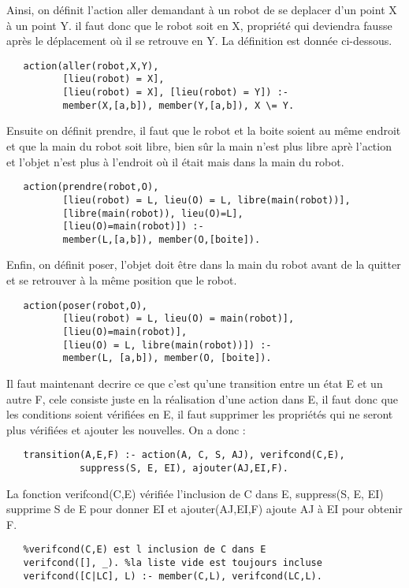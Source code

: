 \documentclass[a4paper,10pt]{article}
\begin{document}
  Ainsi, on d\'{e}finit l'action aller demandant \`{a} un robot de se deplacer d'un point X \`{a} un point Y. il faut donc que le robot soit en X,
  propri\'{e}t\'{e} qui deviendra fausse apr\`{e}s le déplacement o\`{u} il se retrouve en Y. La d\'{e}finition est donn\'{e}e ci-dessous.
  \begin{lstlisting}
   action(aller(robot,X,Y), 
          [lieu(robot) = X], 
          [lieu(robot) = X], [lieu(robot) = Y]) :-
	      member(X,[a,b]), member(Y,[a,b]), X \= Y.
  \end{lstlisting}
  Ensuite on d\'{e}finit prendre, il faut que le robot et la boite soient au m\^{e}me endroit et que la main du robot soit libre, bien s\^{u}r
  la main n'est plus libre apr\`{e} l'action et l'objet n'est plus \`{a} l'endroit o\`{u} il \'{e}tait mais dans la main du robot.
  \begin{lstlisting}
   action(prendre(robot,O), 
          [lieu(robot) = L, lieu(O) = L, libre(main(robot))], 
          [libre(main(robot)), lieu(O)=L], 
          [lieu(O)=main(robot)]) :-
	      member(L,[a,b]), member(O,[boite]).
  \end{lstlisting}
  Enfin, on d\'{e}finit poser, l'objet doit \^{e}tre dans la main du robot avant de la quitter et se retrouver \`{a} la m\^{e}me position que le robot.
  \begin{lstlisting}
   action(poser(robot,O), 
          [lieu(robot) = L, lieu(O) = main(robot)], 
          [lieu(O)=main(robot)], 
          [lieu(O) = L, libre(main(robot))]) :- 
	      member(L, [a,b]), member(O, [boite]).
  \end{lstlisting}
  Il faut maintenant decrire ce que c'est qu'une transition entre un \'{e}tat E et un autre F, cele consiste juste en la réalisation d'une action dans
  E, il faut donc que les conditions soient v\'{e}rifi\'{e}es en E, il faut supprimer les propri\'{e}t\'{e}s qui ne seront plus v\'{e}rifi\'{e}es et 
  ajouter les nouvelles. On a donc :
  \begin{lstlisting}
   transition(A,E,F) :- action(A, C, S, AJ), verifcond(C,E), 
			 suppress(S, E, EI), ajouter(AJ,EI,F).
  \end{lstlisting}
  La fonction verifcond(C,E) v\'{e}rifi\'{e}e l'inclusion de C dans E, suppress(S, E, EI) supprime S de E pour donner EI et ajouter(AJ,EI,F)
  ajoute AJ \`{a} EI pour obtenir F.
  \begin{lstlisting}
   %verifcond(C,E) est l inclusion de C dans E
   verifcond([], _). %la liste vide est toujours incluse
   verifcond([C|LC], L) :- member(C,L), verifcond(LC,L).
  \end{lstlisting}
\end{document}
